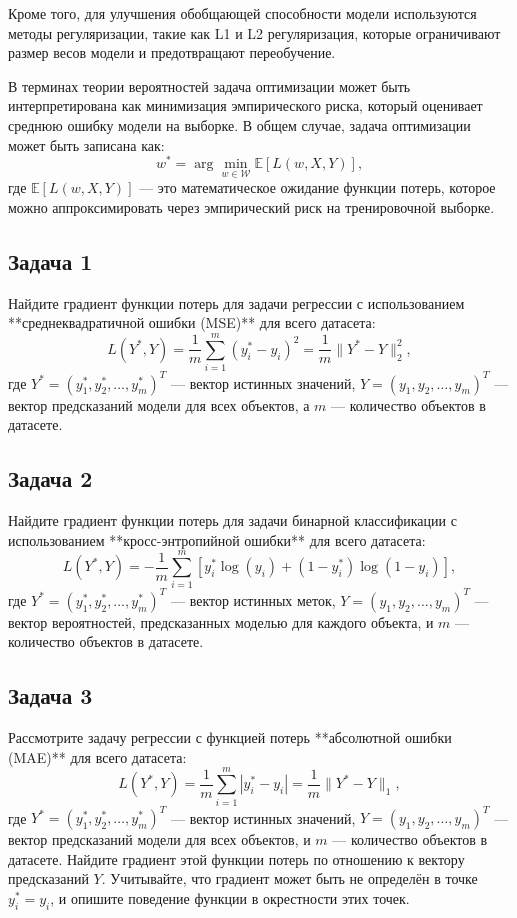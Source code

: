 Кроме того, для улучшения обобщающей способности модели используются методы регуляризации, такие как L1 и L2 регуляризация, которые ограничивают размер весов модели и предотвращают переобучение.

В терминах теории вероятностей задача оптимизации может быть интерпретирована как минимизация эмпирического риска, который оценивает среднюю ошибку модели на выборке. В общем случае, задача оптимизации может быть записана как:
\[
    w^* = \arg\min_{w \in \mathcal{W}} \mathbb{E}[L(w, X, Y)],
\]
где \( \mathbb{E}[L(w, X, Y)] \) — это математическое ожидание функции потерь, которое можно аппроксимировать через эмпирический риск на тренировочной выборке.

\subsection*{Задача 1}

Найдите градиент функции потерь для задачи регрессии с использованием **среднеквадратичной ошибки (MSE)** для всего датасета:
\[
    L(Y^*, Y) = \frac{1}{m} \sum_{i=1}^m (y_i^* - y_i)^2 = \frac{1}{m} \|Y^* - Y\|_2^2,
\]
где \( Y^* = (y_1^*, y_2^*, \dots, y_m^*)^T \) — вектор истинных значений, \( Y = (y_1, y_2, \dots, y_m)^T \) — вектор предсказаний модели для всех объектов, а \( m \) — количество объектов в датасете.

\subsection*{Задача 2}

Найдите градиент функции потерь для задачи бинарной классификации с использованием **кросс-энтропийной ошибки** для всего датасета:
\[
    L(Y^*, Y) = - \frac{1}{m} \sum_{i=1}^m \left[ y_i^* \log(y_i) + (1 - y_i^*) \log(1 - y_i) \right],
\]
где \( Y^* = (y_1^*, y_2^*, \dots, y_m^*)^T \) — вектор истинных меток, \( Y = (y_1, y_2, \dots, y_m)^T \) — вектор вероятностей, предсказанных моделью для каждого объекта, и \( m \) — количество объектов в датасете.

\subsection*{Задача 3}

Рассмотрите задачу регрессии с функцией потерь **абсолютной ошибки (MAE)** для всего датасета:
\[
    L(Y^*, Y) = \frac{1}{m} \sum_{i=1}^m |y_i^* - y_i| = \frac{1}{m} \|Y^* - Y\|_1,
\]
где \( Y^* = (y_1^*, y_2^*, \dots, y_m^*)^T \) — вектор истинных значений, \( Y = (y_1, y_2, \dots, y_m)^T \) — вектор предсказаний модели для всех объектов, и \( m \) — количество объектов в датасете. Найдите градиент этой функции потерь по отношению к вектору предсказаний \( Y \). Учитывайте, что градиент может быть не определён в точке \( y_i^* = y_i \), и опишите поведение функции в окрестности этих точек.



